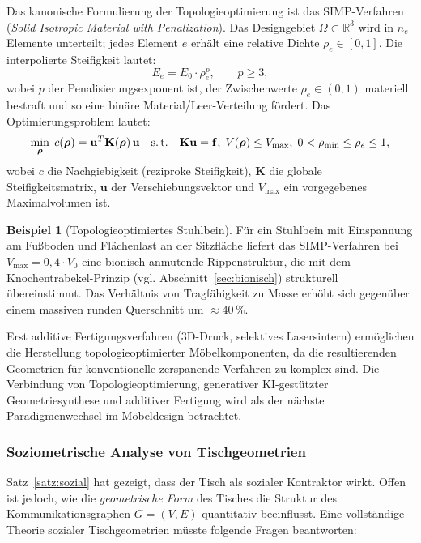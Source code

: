\documentclass[a4paper,12pt]{article}
\theoremstyle{definition}
\newtheorem{beispiel}{Beispiel}
\begin{document}
Das kanonische Formulierung der Topologieoptimierung ist das SIMP-Verfahren~\cite{BendsoeSignmund2003}
(\emph{Solid Isotropic Material with Penalization}). Das Designgebiet
$\Omega \subset \mathbb{R}^3$ wird in $n_e$ Elemente unterteilt; jedes Element $e$
erh\"{a}lt eine relative Dichte $\rho_e \in [0, 1]$.
Die interpolierte Steifigkeit lautet:
\[
	E_e = E_0 \cdot \rho_e^p, \qquad p \geq 3,
\]
wobei $p$ der Penalisierungsexponent ist, der Zwischenwerte $\rho_e \in (0,1)$
materiell bestraft und so eine bin\"{a}re Material/Leer-Verteilung f\"{o}rdert.
Das Optimierungsproblem lautet:
\[
	\min_{\boldsymbol{\rho}} \; c(\boldsymbol{\rho}) = \mathbf{u}^T \mathbf{K}(\boldsymbol{\rho})\,\mathbf{u}
	\quad \text{s.\,t.} \quad
	\mathbf{K}\mathbf{u} = \mathbf{f},\;
	V(\boldsymbol{\rho}) \leq V_{\max},\;
	0 < \rho_{\min} \leq \rho_e \leq 1,
\]
wobei $c$ die Nachgiebigkeit (reziproke Steifigkeit), $\mathbf{K}$ die globale
Steifigkeitsmatrix, $\mathbf{u}$ der Verschiebungsvektor und $V_{\max}$ ein
vorgegebenes Maximalvolumen ist.

\begin{beispiel}[Topologieoptimiertes Stuhlbein]
	F\"{u}r ein Stuhlbein mit Einspannung am Fu\ss{}boden und Fl\"{a}chenlast an der
	Sitzfl\"{a}che liefert das SIMP-Verfahren bei $V_{\max} = 0{,}4 \cdot V_0$ eine
	bionisch anmutende Rippenstruktur, die mit dem Knochentrabekel-Prinzip
	(vgl. Abschnitt~\ref{sec:bionisch}) strukturell \"{u}bereinstimmt. Das Verh\"{a}ltnis
	von Tragf\"{a}higkeit zu Masse erh\"{o}ht sich gegen\"{u}ber einem massiven runden
	Querschnitt um $\approx 40\,\%$.
\end{beispiel}

Erst additive Fertigungsverfahren (3D-Druck, selektives Lasersintern) erm\"{o}glichen
die Herstellung topologieoptimierter M\"{o}belkomponenten, da die resultierenden
Geometrien f\"{u}r konventionelle zerspanende Verfahren zu komplex sind.
Die Verbindung von Topologieoptimierung, generativer KI-gest\"{u}tzter
Geometriesynthese und additiver Fertigung wird als der n\"{a}chste Paradigmenwechsel
im M\"{o}beldesign betrachtet.

\subsubsection{Soziometrische Analyse von Tischgeometrien}
\label{sec:soziometrisch}

Satz~\ref{satz:sozial} hat gezeigt, dass der Tisch als sozialer Kontraktor wirkt.
Offen ist jedoch, wie die \emph{geometrische Form} des Tisches die Struktur des
Kommunikationsgraphen $G = (V, E)$ quantitativ beeinflusst. Eine vollst\"{a}ndige
Theorie sozialer Tischgeometrien m\"{u}sste folgende Fragen beantworten:
\end{document}
